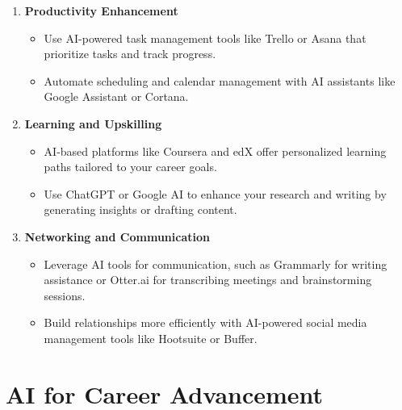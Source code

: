 \documentclass[
  letterpaper,
  DIV=11,
  numbers=noendperiod]{scrreprt}
\providecommand{\tightlist}{%
  \setlength{\itemsep}{0pt}\setlength{\parskip}{0pt}}\usepackage{longtable,booktabs,array}
\begin{document}
\begin{enumerate}
\def\labelenumi{\arabic{enumi}.}
\item
  \textbf{Productivity Enhancement}

  \begin{itemize}
  \tightlist
  \item
    Use AI-powered task management tools like Trello or Asana that
    prioritize tasks and track progress.
  \item
    Automate scheduling and calendar management with AI assistants like
    Google Assistant or Cortana.
  \end{itemize}
\item
  \textbf{Learning and Upskilling}

  \begin{itemize}
  \tightlist
  \item
    AI-based platforms like Coursera and edX offer personalized learning
    paths tailored to your career goals.
  \item
    Use ChatGPT or Google AI to enhance your research and writing by
    generating insights or drafting content.
  \end{itemize}
\item
  \textbf{Networking and Communication}

  \begin{itemize}
  \tightlist
  \item
    Leverage AI tools for communication, such as Grammarly for writing
    assistance or Otter.ai for transcribing meetings and brainstorming
    sessions.
  \item
    Build relationships more efficiently with AI-powered social media
    management tools like Hootsuite or Buffer.
  \end{itemize}
\end{enumerate}

\section{AI for Career Advancement}\label{ai-for-career-advancement}
\end{document}
